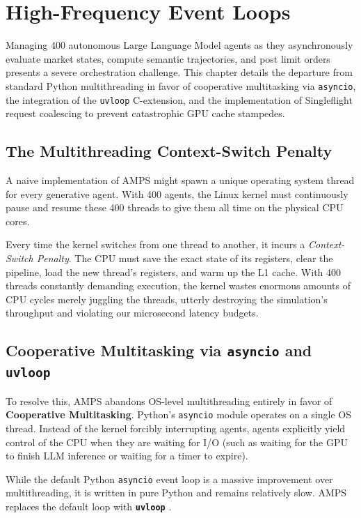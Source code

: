 \chapter{High-Frequency Event Loops}
\label{ch:high_frequency_event_loops}
\label{ch:event_loops}

Managing 400 autonomous Large Language Model agents as they asynchronously evaluate market states, compute semantic trajectories, and post limit orders presents a severe orchestration challenge. This chapter details the departure from standard Python multithreading in favor of cooperative multitasking via \texttt{asyncio}, the integration of the \texttt{uvloop} C-extension, and the implementation of Singleflight request coalescing to prevent catastrophic GPU cache stampedes.

\section{The Multithreading Context-Switch Penalty}

A naive implementation of AMPS might spawn a unique operating system thread for every generative agent. With 400 agents, the Linux kernel must continuously pause and resume these 400 threads to give them all time on the physical CPU cores. 

Every time the kernel switches from one thread to another, it incurs a \textit{Context-Switch Penalty}. The CPU must save the exact state of its registers, clear the pipeline, load the new thread's registers, and warm up the L1 cache. With 400 threads constantly demanding execution, the kernel wastes enormous amounts of CPU cycles merely juggling the threads, utterly destroying the simulation's throughput and violating our microsecond latency budgets.

\section{Cooperative Multitasking via \texttt{asyncio} and \texttt{uvloop}}

To resolve this, AMPS abandons OS-level multithreading entirely in favor of \textbf{Cooperative Multitasking}. Python's \texttt{asyncio} module operates on a single OS thread. Instead of the kernel forcibly interrupting agents, agents explicitly yield control of the CPU when they are waiting for I/O (such as waiting for the GPU to finish LLM inference or waiting for a timer to expire).

While the default Python \texttt{asyncio} event loop is a massive improvement over multithreading, it is written in pure Python and remains relatively slow. AMPS replaces the default loop with \textbf{\texttt{uvloop}} \cite{selivanov2016uvloop}.

